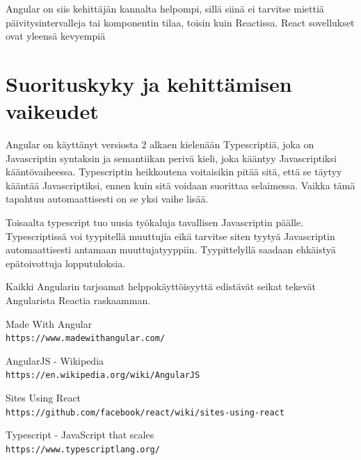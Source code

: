 \documentclass[a4paper,12pt,twoside]{article} %
\begin{document}
\vspace{4mm}\noindent
Angular on siis kehittäjän kannalta helpompi, sillä siinä ei tarvitse miettiä päivitysintervalleja tai komponentin tilaa, toisin kuin Reactissa. React sovellukset ovat yleensä kevyempiä 


\newpage

\section{Suorituskyky ja kehittämisen vaikeudet}

Angular on käyttänyt versiosta 2 alkaen kielenään Typescriptiä, joka on Javascriptin syntaksin ja semantiikan perivä kieli, joka kääntyy Javascriptiksi kääntövaiheessa. Typescriptin heikkoutena voitaisikin pitää sitä, että se täytyy kääntää Javascriptiksi, ennen kuin sitä voidaan suorittaa selaimessa. Vaikka tämä tapahtuu automaattisesti on se yksi vaihe lisää.\cite{typescript}

\vspace{4mm}\noindent
Toisaalta typescript tuo uusia työkaluja tavallisen Javascriptin päälle. Typescriptissä voi tyypitellä muuttujia eikä tarvitse siten tyytyä Javascriptin automaattisesti antamaan muuttujatyyppiin. Tyypittelyllä saadaan ehkäistyä epätoivottuja lopputuloksia.

\vspace{4mm}\noindent
Kaikki Angularin tarjoamat helppokäyttöisyyttä edistävät seikat tekevät Angularista Reactia raskaamman.

\newpage
\setcounter{secnumdepth}{0}

\begin{thebibliography}{9}

Made With Angular
\\\texttt{https://www.madewithangular.com/}

AngularJS - Wikipedia
\\\texttt{https://en.wikipedia.org/wiki/AngularJS}

Sites Using React
\\\texttt{https://github.com/facebook/react/wiki/sites-using-react}

Typescript - JavaScript that scales
\\\texttt{https://www.typescriptlang.org/}

\end{thebibliography}
\end{document}
